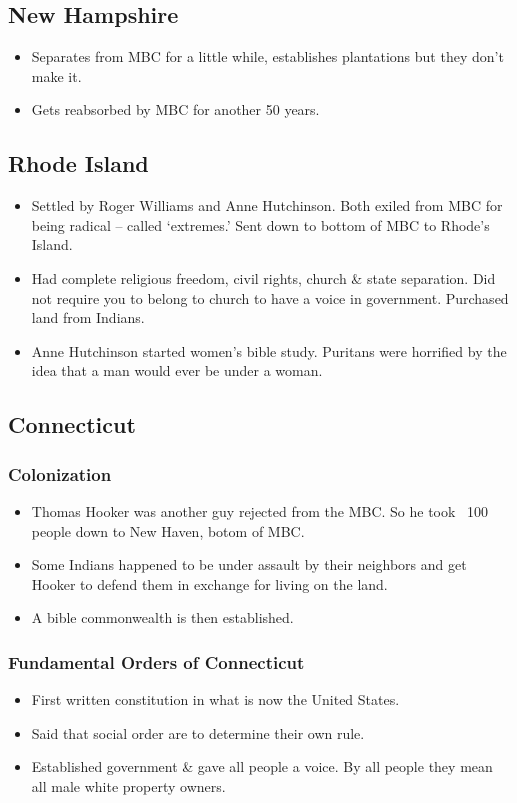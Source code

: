 \documentclass{article}
\begin{document}
  \subsection{New Hampshire}
      \begin{itemize}
        \item Separates from MBC for a little while, establishes plantations but they don't make it.
        \item Gets reabsorbed by MBC for another 50 years.
      \end{itemize}

    \subsection{Rhode Island}
      \begin{itemize}
        \item Settled by Roger Williams and Anne Hutchinson. Both exiled from MBC for being radical -- called `extremes.' Sent down to bottom of MBC to Rhode's Island. 
        \item Had complete religious freedom, civil rights, church \& state separation. Did not require you to belong to church to have a voice in government. Purchased land from Indians.
        \item Anne Hutchinson started women's bible study. Puritans were horrified by the idea that a man would ever be under a woman.
      \end{itemize}

    \subsection{Connecticut}
      \subsubsection{Colonization}
        \begin{itemize}
          \item Thomas Hooker was another guy rejected from the MBC. So he took ~100 people down to New Haven, botom of MBC. 
          \item Some Indians happened to be under assault by their neighbors and get Hooker to defend them in exchange for living on the land.
          \item A bible commonwealth is then established.
        \end{itemize}
      \subsubsection{Fundamental Orders of Connecticut}
        \begin{itemize}
          \item First written constitution in what is now the United States.
          \item Said that social order are to determine their own rule.
          \item Established government \& gave all people a voice. By all people they mean all male white property owners.
        \end{itemize}
\end{document}
